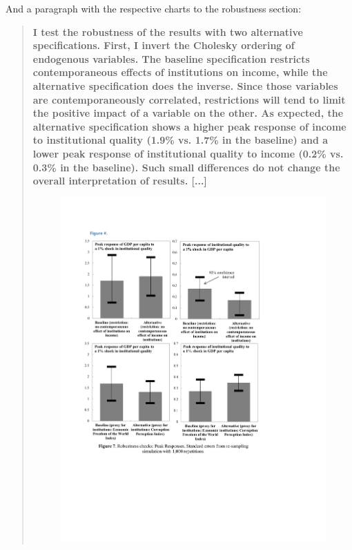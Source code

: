 \documentclass{article}
\begin{document}
\begin{enumerate}
    And a paragraph with the respective charts to the robustness section:

    \begin{quote}
        \textbf{I test the robustness of the results with two alternative specifications. First, I invert the Cholesky ordering of endogenous variables. The baseline specification restricts  contemporaneous effects of institutions on income, while the alternative specification does the inverse. Since those variables are contemporaneously correlated, restrictions will tend to limit the positive impact of a variable on the other. As expected, the alternative specification shows a higher peak response of income to institutional quality (1.9\% vs. 1.7\% in the baseline) and a lower peak response of institutional quality to income (0.2\% vs. 0.3\% in the baseline). Such small differences do not change the overall interpretation of results. [...]}        
        \begin{figure}[ht]
        \begin{center}
            \includegraphics[scale=0.7]{robustness.pdf}
        \end{center}
        \end{figure}
    \end{quote}

    
\end{enumerate}
\end{document}
